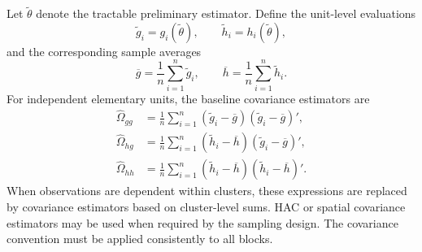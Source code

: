 Let $\widetilde\theta$ denote the tractable preliminary estimator. Define the
unit-level evaluations
\[
 \widetilde g_i=g_i(\widetilde\theta),
 \qquad
 \widetilde h_i=h_i(\widetilde\theta),
\]
and the corresponding sample averages
\[
 \overline g
 =
 \frac{1}{n}\sum_{i=1}^n\widetilde g_i,
 \qquad
 \overline h
 =
 \frac{1}{n}\sum_{i=1}^n\widetilde h_i.
\]
For independent elementary units, the baseline covariance estimators are
\begin{align}
 \widehat\Omega_{gg}
 &=
 \frac{1}{n}\sum_{i=1}^n
 (\widetilde g_i-\overline g)
 (\widetilde g_i-\overline g)',
 \label{eq:app_sample_omega_gg}\\
 \widehat\Omega_{hg}
 &=
 \frac{1}{n}\sum_{i=1}^n
 (\widetilde h_i-\overline h)
 (\widetilde g_i-\overline g)',
 \label{eq:app_sample_omega_hg}\\
 \widehat\Omega_{hh}
 &=
 \frac{1}{n}\sum_{i=1}^n
 (\widetilde h_i-\overline h)
 (\widetilde h_i-\overline h)'.
 \label{eq:app_sample_omega_hh}
\end{align}
When observations are dependent within clusters, these expressions are replaced
by covariance estimators based on cluster-level sums. HAC or spatial covariance
estimators may be used when required by the sampling design. The covariance
convention must be applied consistently to all blocks.

